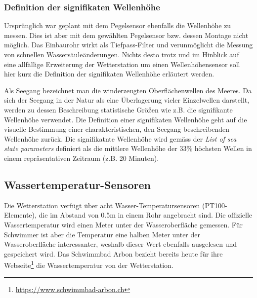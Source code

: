 \subsubsection{Definition der signifikaten Wellenhöhe}
Ursprünglich war geplant mit dem Pegelsensor ebenfalls die Wellenhöhe zu messen. Dies ist aber mit dem gewählten Pegelsensor bzw. dessen Montage nicht möglich. Das Einbaurohr wirkt als Tiefpass-Filter und verunmöglicht die Messung von schnellen Wassersäuleänderungen. Nichts desto trotz und im Hinblick auf eine allfällige Erweiterung der Wetterstation um einen Wellenhöhensensor soll hier kurz die Definition der signifikaten Wellenhöhe erläutert werden.

Als Seegang bezeichnet man die winderzeugten Oberflächenwellen des Meeres. Da sich der Seegang in der Natur als eine Überlagerung vieler Einzelwellen darstellt, werden zu dessen Beschreibung statistische Größen wie z.B. die signifikante Wellenhöhe verwendet. Die Definition einer signifikaten Wellenhöhe geht auf die visuelle Bestimmung einer charakteristischen, den Seegang beschreibenden Wellenhöhe zurück. Die signifikatnte Wellenhöhe wird gemäss der \textit{List of sea state parameters}\cite{1986Iahr} definiert als die mittlere Wellenhöhe der 33\% höchsten Wellen in einem repräsentativen Zeitraum (z.B. 20 Minuten).


\subsection{Wassertemperatur-Sensoren}
Die Wetterstation verfügt über acht Wasser-Temperatursensoren (PT100-Elemente), die im Abstand von 0.5m in einem Rohr angebracht sind. Die offizielle Wassertemperatur wird einen Meter unter der Wasseroberfläche gemessen. Für Schwimmer ist aber die Temperatur eine halben Meter unter der Wasseroberfläche interessanter, weshalb dieser Wert ebenfalls ausgelesen und gespeichert wird. Das Schwimmbad Arbon bezieht bereits heute für ihre Webseite\footnote{\url{https://www.schwimmbad-arbon.ch}} die Wassertemperatur von der Wetterstation.

